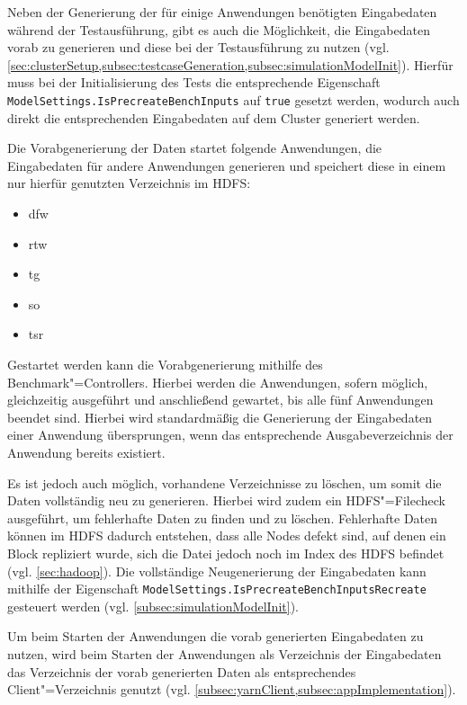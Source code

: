 Neben der Generierung der für einige Anwendungen benötigten Eingabedaten während der Testausführung, gibt es auch die Möglichkeit, die Eingabedaten vorab zu generieren und diese bei der Testausführung zu nutzen (vgl. \cref{sec:clusterSetup,subsec:testcaseGeneration,subsec:simulationModelInit}).
Hierfür muss bei der Initialisierung des Tests die entsprechende Eigenschaft \texttt{ModelSettings.IsPrecreateBenchInputs} auf \texttt{true} gesetzt werden, wodurch auch direkt die entsprechenden Eingabedaten auf dem Cluster generiert werden.

Die Vorabgenerierung der Daten startet folgende Anwendungen, die Eingabedaten für andere Anwendungen generieren und speichert diese in einem nur hierfür genutzten Verzeichnis im HDFS:

\begin{itemize}
    \item \acrlong{dfw}
    \item \acrlong{rtw}
    \item \acrlong{tg}
    \item \acrlong{so}
    \item \acrlong{tsr}
\end{itemize}

Gestartet werden kann die Vorabgenerierung mithilfe des Benchmark"=Controllers.
Hierbei werden die Anwendungen, sofern möglich, gleichzeitig ausgeführt und anschließend gewartet, bis alle fünf Anwendungen beendet sind.
Hierbei wird standardmäßig die Generierung der Eingabedaten einer Anwendung übersprungen, wenn das entsprechende Ausgabeverzeichnis der Anwendung bereits existiert.

Es ist jedoch auch möglich, vorhandene Verzeichnisse zu löschen, um somit die Daten vollständig neu zu generieren.
Hierbei wird zudem ein HDFS"=Filecheck ausgeführt, um fehlerhafte Daten zu finden und zu löschen.
Fehlerhafte Daten können im HDFS \zB dadurch entstehen, dass alle Nodes defekt sind, auf denen ein Block repliziert wurde, sich die Datei jedoch noch im Index des HDFS befindet (vgl. \cref{sec:hadoop}).
Die vollständige Neugenerierung der Eingabedaten kann mithilfe der Eigenschaft \texttt{ModelSettings.IsPrecreateBenchInputsRecreate} gesteuert werden (vgl. \cref{subsec:simulationModelInit}).

Um beim Starten der Anwendungen die vorab generierten Eingabedaten zu nutzen, wird beim Starten der Anwendungen als Verzeichnis der Eingabedaten das Verzeichnis der vorab generierten Daten als entsprechendes Client"=Verzeichnis genutzt (vgl. \cref{subsec:yarnClient,subsec:appImplementation}).
